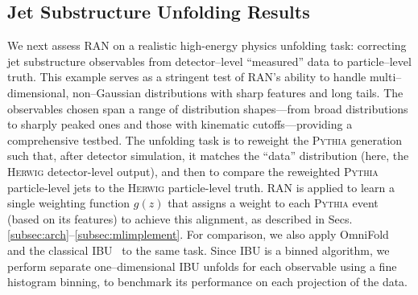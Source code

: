     \subsection{Jet Substructure Unfolding Results}
        We next assess RAN on a realistic high-energy physics unfolding task: correcting jet substructure observables from detector--level “measured” data to particle--level truth.
        This example serves as a stringent test of RAN’s ability to handle multi--dimensional, non--Gaussian distributions with sharp features and long tails.
        The observables chosen span a range of distribution shapes---from broad distributions to sharply peaked ones and those with kinematic cutoffs---providing a comprehensive testbed.
        The unfolding task is to reweight the \textsc{Pythia} generation such that, after detector simulation, it matches the “data” distribution (here, the \textsc{Herwig} detector-level output), and then to compare the reweighted \textsc{Pythia} particle-level jets to the \textsc{Herwig} particle-level truth.
        RAN is applied to learn a single weighting function $g(z)$ that assigns a weight to each \textsc{Pythia} event (based on its features) to achieve this alignment, as described in Secs.\ref{subsec:arch}–\ref{subsec:mlimplement}.
        For comparison, we also apply OmniFold~ and the classical IBU~ to the same task.
        Since IBU is a binned algorithm, we perform separate one--dimensional IBU unfolds for each observable using a fine histogram binning, to benchmark its performance on each projection of the data.

